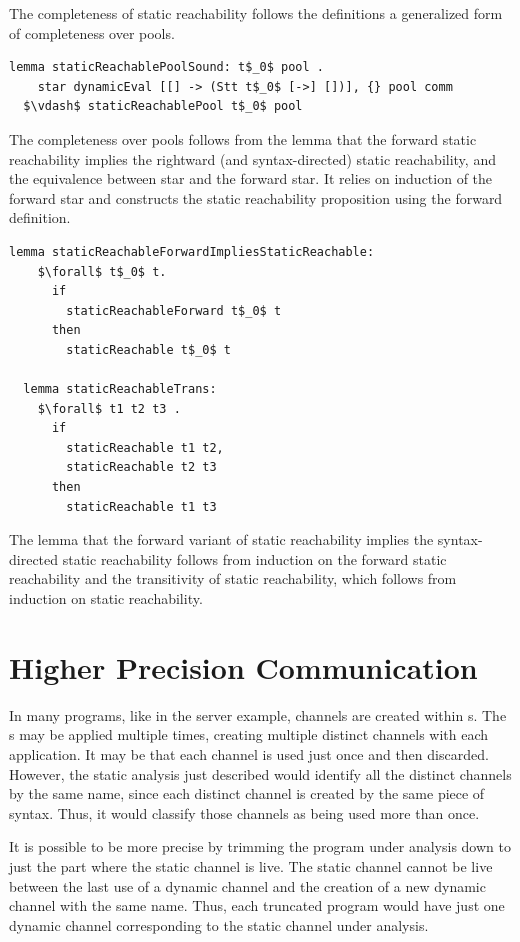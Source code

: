 \documentclass[letterpaper, 11pt]{extarticle}
\begin{document}
The completeness of static reachability follows the definitions
a generalized form of completeness over pools.

\begin{lstlisting}[language=logic, mathescape]
  lemma staticReachablePoolSound: t$_0$ pool .
    star dynamicEval [[] -> (Stt t$_0$ [->] [])], {} pool comm 
  $\vdash$ staticReachablePool t$_0$ pool
\end{lstlisting}

The completeness over pools follows from the lemma that the forward
static reachability implies the rightward (and syntax-directed) static reachability,
and the equivalence between star and the forward star.  It relies on induction of the
forward star and constructs the static reachability
proposition using the forward definition.  

\begin{lstlisting}[language=logic, mathescape]
  lemma staticReachableForwardImpliesStaticReachable:
    $\forall$ t$_0$ t. 
      if
        staticReachableForward t$_0$ t
      then
        staticReachable t$_0$ t

  lemma staticReachableTrans:
    $\forall$ t1 t2 t3 .
      if 
        staticReachable t1 t2,
        staticReachable t2 t3
      then
        staticReachable t1 t3
\end{lstlisting}

The lemma that the forward variant of static reachability implies the syntax-directed static
reachability follows from induction on the forward static reachability and the
transitivity of static reachability, which follows from induction on static reachability.

\section{Higher Precision Communication} \label{high-precision}
In many programs, like in the server example, channels are created within s.
The s may be applied multiple times, creating multiple distinct channels
with each application. It may be that each channel is used just once and then discarded.
However, the static analysis just described would identify all the distinct channels by the
same name, since each distinct channel is created by the same piece of syntax.
Thus, it would classify those channels as being used more than once.

It is possible to be more precise by trimming the program under analysis down to just the part
where the static channel is live. The static channel cannot be live between the last use of a
dynamic channel and the creation of a new dynamic channel with the same name.  Thus, each
truncated program would have just one dynamic channel corresponding to the static channel under
analysis. 
\end{document}
